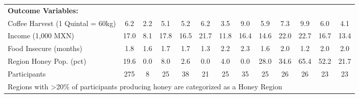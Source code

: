 \begin{table}[htbp]
\begin{tabular}{l*{12}{c}}
\addlinespace
\textbf{Outcome Variables:}&         &         &         &         &         &         &         &         &         &         &         &         \\
\addlinespace
Coffee Harvest (1 Quintal = 60kg)&      6.2&      2.2&      5.1&      5.2&      6.2&      3.5&      9.0&      5.9&      7.3&      9.9&      6.0&      4.1\\
\addlinespace
Income (1,000 MXN)&     17.0&      8.1&     17.8&     16.5&     21.7&     11.8&     16.4&     14.6&     22.0&     22.7&     16.7&     13.4\\
\addlinespace
Food Insecure (months)&      1.8&      1.6&      1.7&      1.7&      1.3&      2.2&      2.3&      1.6&      2.0&      1.2&      2.0&      2.0\\
\addlinespace
Region Honey Pop. (pct)&     19.6&      0.0&      8.0&      2.6&      0.0&      4.0&      0.0&     28.0&     34.6&     65.4&     52.2&     21.7\\
\midrule
Participants    &      275&        8&       25&       38&       21&       25&       35&       25&       26&       26&       23&       23\\
\bottomrule
\multicolumn{13}{l}{\footnotesize Regions with \textgreater 20\% of participants producing honey are categorized as a Honey Region}\\
\end{tabular}
\end{table}
